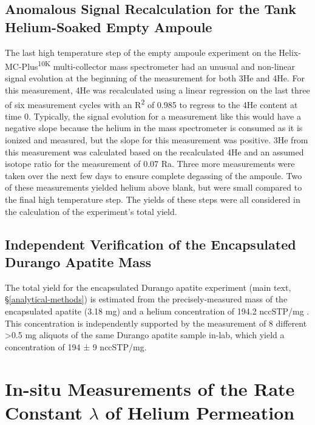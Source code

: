 \subsection{Anomalous Signal Recalculation for the Tank Helium-Soaked Empty Ampoule}\label{anomalous-signal-recalculation}

The last high temperature step of the empty ampoule experiment on the Helix-MC-Plus\textsuperscript{10K} multi-collector mass spectrometer had an unusual and non-linear signal evolution at the beginning of the measurement for both 3He and 4He. For this measurement, 4He was recalculated using a linear regression on the last three of six measurement cycles with an R\textsuperscript{2} of 0.985 to regress to the 4He content at time 0. Typically, the signal evolution for a measurement like this would have a negative slope because the helium in the mass spectrometer is consumed as it is ionized and measured, but the slope for this measurement was positive. 3He from this measurement was calculated based on the recalculated 4He and an assumed isotope ratio for the measurement of 0.07 Ra. Three more measurements were taken over the next few days to ensure complete degassing of the ampoule. Two of these measurements yielded helium above blank, but were small compared to the final high temperature step. The yields of these steps were all considered in the calculation of the experiment's total yield.

\subsection{Independent Verification of the Encapsulated Durango Apatite Mass}\label{durango-mass-verification}

The total yield for the encapsulated Durango apatite experiment (main text, \S\ref{analytical-methods}) is estimated from the precisely-measured mass of the encapsulated apatite (3.18 mg) and a helium concentration of 194.2 nccSTP/mg \citep{farley2000}. This concentration is independently supported by the measurement of 8 different \textgreater0.5 mg aliquots of the same Durango apatite sample in-lab, which yield a concentration of 194 ± 9 nccSTP/mg.

\section{In-situ Measurements of the Rate Constant $\lambda$ of Helium Permeation}\label{sec:s-moved}

